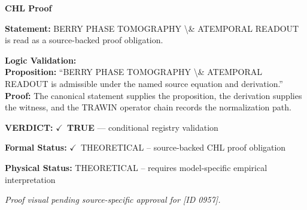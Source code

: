 \vspace{0.45em}
\noindent\textbf{CHL Proof}\par
\textbf{Statement:} BERRY PHASE TOMOGRAPHY \textbackslash{}\& ATEMPORAL READOUT is read as a source-backed proof obligation.

\textbf{Logic Validation:}\\
\textbf{Proposition:} ``BERRY PHASE TOMOGRAPHY \textbackslash{}\& ATEMPORAL READOUT is admissible under the named source equation and derivation.''\\
\textbf{Proof:} The canonical statement supplies the proposition, the derivation supplies the witness, and the TRAWIN operator chain records the normalization path.

\textbf{VERDICT:} \ensuremath{\checkmark}\ \textbf{TRUE} --- conditional registry validation

\textbf{Formal Status:} \ensuremath{\checkmark}\ THEORETICAL -- source-backed CHL proof obligation

\textbf{Physical Status:} THEORETICAL -- requires model-specific empirical interpretation
\par\vspace{0.45em}
\par
\vfill
\begingroup\footnotesize\itshape
Proof visual pending source-specific approval for [ID 0957].
\par\endgroup
\vfill
\endgroup
\endgroup
